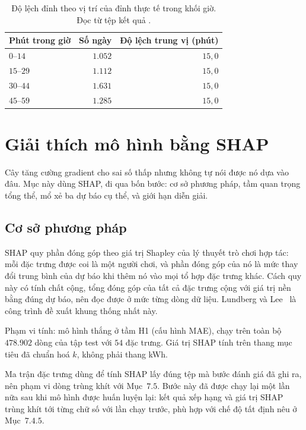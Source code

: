 \begin{table}[htbp]
\centering

\small
\begin{tabular}{l r r}
\toprule
\textbf{Phút trong giờ} & \textbf{Số ngày} & \textbf{Độ lệch trung vị (phút)} \\
\midrule
$0$--$14$  & $1.052$ & $15{,}0$ \\
$15$--$29$ & $1.112$ & $15{,}0$ \\
$30$--$44$ & $1.631$ & $15{,}0$ \\
$45$--$59$ & $1.285$ & $15{,}0$ \\
\bottomrule
\end{tabular}
\caption[Độ lệch đỉnh theo vị trí của đỉnh thực tế trong khối giờ]{Độ lệch đỉnh theo vị trí của đỉnh thực tế trong khối giờ. Đọc từ tệp kết quả
.}
\label{tab:lech_theo_vi_tri}
\end{table}

\FloatBarrier
\section{Giải thích mô hình bằng SHAP}

Cây tăng cường gradient cho sai số thấp nhưng không tự nói được nó dựa vào đâu. Mục này dùng
SHAP, đi qua bốn bước: cơ sở phương pháp, tầm quan trọng tổng thể, mổ xẻ ba dự báo cụ thể, và
giới hạn diễn giải.

\FloatBarrier
\subsection{Cơ sở phương pháp}

SHAP quy phần đóng góp theo giá trị Shapley của lý thuyết trò chơi hợp tác: mỗi đặc trưng được
coi là một người chơi, và phần đóng góp của nó là mức thay đổi trung bình của dự báo khi thêm
nó vào mọi tổ hợp đặc trưng khác. Cách quy này có tính chất cộng, tổng đóng góp của tất cả
đặc trưng cộng với giá trị nền bằng đúng dự báo, nên đọc được ở mức từng dòng dữ liệu.
Lundberg và Lee~\cite{lundberg2017shap} là công trình đề xuất khung thống nhất này.



Phạm vi tính: mô hình thắng ở tầm H1 (cấu hình MAE), chạy trên toàn bộ $478.902$ dòng của tập
test với $54$ đặc trưng. Giá trị SHAP tính trên thang mục tiêu đã chuẩn hoá $k$, không phải
thang kWh.

Ma trận đặc trưng dùng để tính SHAP lấy đúng tệp  mà bước đánh giá đã
ghi ra, nên phạm vi dòng trùng khít với Mục~$7.5$. Bước này đã được chạy lại một lần nữa sau khi
mô hình được huấn luyện lại: kết quả xếp hạng và giá trị SHAP trùng khít tới từng chữ số với
lần chạy trước, phù hợp với chế độ tất định nêu ở Mục~$7.4.5$.

